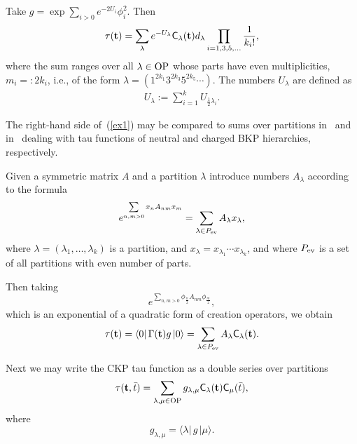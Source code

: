 \documentclass[pdftex]{sigma}
\numberwithin{equation}{section}
\newcommand{\C}{\textsf{C}_}
\newcommand{\bt}{{\bf {t}}}
\renewcommand{\l}{\langle}
\renewcommand{\r}{\rangle}
\begin{document}
\begin{example}
Take $g=\exp \sum\limits_{i>0} e^{-2U_i}\phi_i^2$.
Then
 \begin{gather}\label{ex1}
\tau(\bt) = \sum_{\lambda} e^{-U_\lambda}
\C\lambda(\bt)d_\lambda \prod_{i=1,3,5,\dots} \frac{1}{k_i !},
 \end{gather}
where the sum ranges over all $\lambda\in\rm OP$ whose parts have even
multiplicities, $m_i=:2k_i$, i.e., of the form $\lambda
=\left(1^{2k_1}3^{2k_3}5^{2k_5}\cdots \right)$.
  The numbers $U_\lambda$ are def\/ined as
 \begin{gather}\label{U-lambda}
 U_\lambda := \sum_{i=1}^k U_{\frac 12 \lambda_i}.
 \end{gather}


The right-hand side of~(\ref{ex1}) may be compared to  sums over
partitions in~\cite{HLO} and in~\cite{sQQ} dealing with tau
functions of neutral and charged BKP hierarchies, respectively.
\end{example}

\begin{example}
Given a symmetric matrix $A$ and a partition
$\lambda$ introduce numbers $A_\lambda$ according to the formula
\[
e^{\sum\limits_{n,m > 0}    x_nA_{nm}x_m} = \sum_{\lambda\in
P_{\rm ev}} A_\lambda x_\lambda,
\]
  where $\lambda=(\lambda_1,\dots,\lambda_k)$ is a partition,
  and $x_\lambda=x_{\lambda_1}\cdots x_{\lambda_k}$, and where
  $P_{\rm ev}$ is a set of all partitions with even number of parts.

  Then taking
\[
e^{\sum\limits_{n,m > 0}    \phi_{\frac n2}A_{nm}\phi_{\frac m2}},
\]
 which is an exponential of a quadratic form of  creation operators, we obtain
\[
\tau(\bt) = \l 0|\,\Gamma(\bt) g\,|0\r  = \sum_{\lambda\in
P_{\rm ev}} A_\lambda \C{\lambda}(\bt).
\]


Next we may write the CKP tau function as a double series over
partitions
\[
\tau(\bt,{\bar t})=\sum_{\lambda,\mu\in
\rm OP} g_{\lambda,\mu} \textsf{C}_\lambda(\bt)\C\mu({\bar t}),
\]
 where
 \[
g_{\lambda,\mu} = \l \lambda |\,g\,|\mu\r.
 \]
\end{example}
\end{document}
